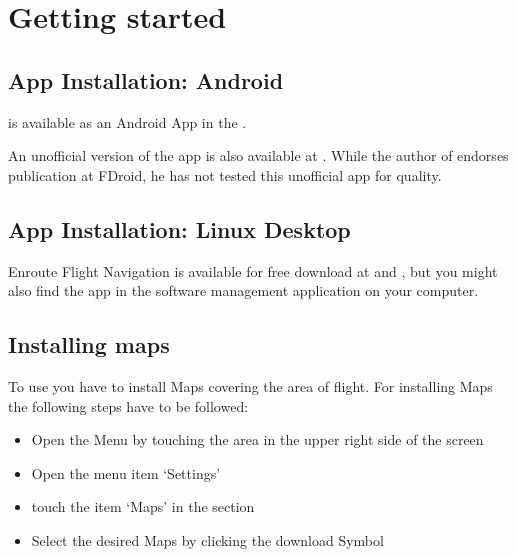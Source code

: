 \documentclass[letterpaper,10pt,english]{sphinxmanual}
\begin{document}
\chapter{Getting started}
\label{\detokenize{01-intro/getting_started:getting-started}}\label{\detokenize{01-intro/getting_started::doc}}

\section{App Installation: Android}
\label{\detokenize{01-intro/getting_started:app-installation-android}}
\sphinxAtStartPar
{} is available as an Android App in the .

\sphinxAtStartPar
An unofficial version of the app is also available at .  While the
author of  endorses publication at F\sphinxhyphen{}Droid, he has
not tested this unofficial app for quality.


\section{App Installation: Linux Desktop}
\label{\detokenize{01-intro/getting_started:app-installation-linux-desktop}}
\sphinxAtStartPar
Enroute Flight Navigation is available for free download at  and
, but you might
also find the app in the software management application on your computer.


\section{Installing maps}
\label{\detokenize{01-intro/getting_started:installing-maps}}
\sphinxAtStartPar
To use  you have to install Maps covering the area
of flight.  For installing Maps the following steps have to be followed:
\begin{itemize}
\item {} 
\sphinxAtStartPar
Open the Menu by touching the area in the upper right side of the screen

\item {} 
\sphinxAtStartPar
Open the menu item ‘Settings’

\item {} 
\sphinxAtStartPar
touch the item ‘Maps’ in the  section

\item {} 
\sphinxAtStartPar
Select the desired Maps by clicking the download Symbol

\end{itemize}
\end{document}
